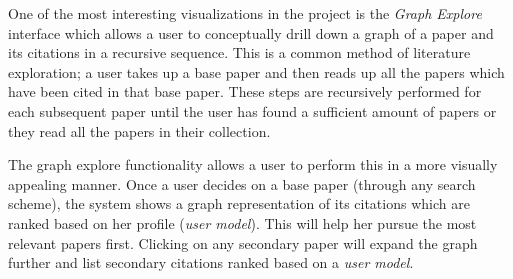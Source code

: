 
One of the most interesting visualizations in the project is the 
\textsl{Graph Explore} interface which allows a user to conceptually 
drill down a graph of a paper and its citations in a recursive sequence.
This is a common method of literature exploration; a user takes up a base paper and then reads up all the papers which have been cited in that base paper.
These steps are recursively performed for each subsequent paper until the user has found a sufficient amount of papers or they read all the papers in their collection.

The graph explore functionality allows a user to perform this in a more visually appealing manner.
Once a user decides on a base paper (through any search scheme), the system shows a graph representation of its citations which are ranked based on her profile (\textsl{user model}).
This will help her pursue the most relevant papers first.
Clicking on any secondary paper will expand the graph further and 
list secondary citations ranked based on a \textsl{user model}.
